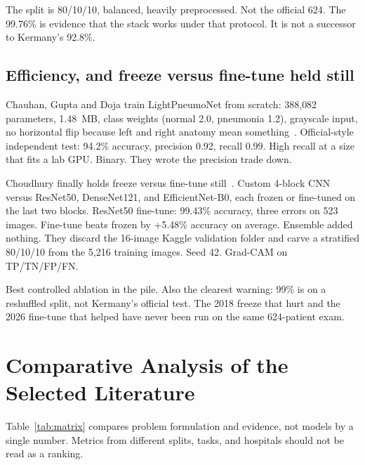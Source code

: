\documentclass[11pt,a4paper]{article}
\begin{document}
The split is 80/10/10, balanced, heavily preprocessed. Not the official 624. The 99.76\% is evidence that the stack works under that protocol. It is not a successor to Kermany's 92.8\%.

\subsection{Efficiency, and freeze versus fine-tune held still}
Chauhan, Gupta and Doja train LightPneumoNet from scratch: 388{,}082 parameters, 1.48~MB, class weights (normal 2.0, pneumonia 1.2), grayscale input, no horizontal flip because left and right anatomy mean something~\cite{chauhan2025}. Official-style independent test: 94.2\% accuracy, precision 0.92, recall 0.99. High recall at a size that fits a lab GPU. Binary. They wrote the precision trade down.

Choudhury finally holds freeze versus fine-tune still~\cite{choudhury2026}. Custom 4-block CNN versus ResNet50, DenseNet121, and EfficientNet-B0, each frozen or fine-tuned on the last two blocks. ResNet50 fine-tune: 99.43\% accuracy, three errors on 523 images. Fine-tune beats frozen by +5.48\% accuracy on average. Ensemble added nothing. They discard the 16-image Kaggle validation folder and carve a stratified 80/10/10 from the 5{,}216 training images. Seed 42. Grad-CAM on TP/TN/FP/FN.

Best controlled ablation in the pile. Also the clearest warning: 99\% is on a reshuffled split, not Kermany's official test. The 2018 freeze that hurt and the 2026 fine-tune that helped have never been run on the same 624-patient exam.

\section{Comparative Analysis of the Selected Literature}
Table~\ref{tab:matrix} compares problem formulation and evidence, not models by a single number. Metrics from different splits, tasks, and hospitals should not be read as a ranking.
\end{document}
